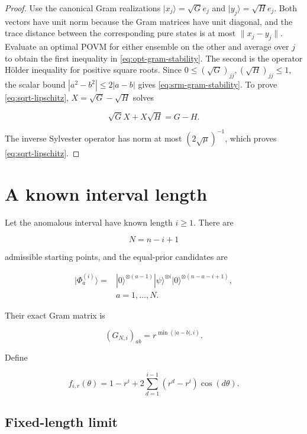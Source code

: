 \begin{proof}
Use the canonical Gram realizations \(|x_j\rangle=\sqrt G e_j\) and
\(|y_j\rangle=\sqrt H e_j\). Both vectors have unit norm because the Gram
matrices have unit diagonal, and the trace distance between the corresponding
pure states is at most \(\|x_j-y_j\|\). Evaluate an optimal POVM for either
ensemble on the other and average over \(j\) to obtain the first inequality in
\eqref{eq:opt-gram-stability}. The second is the operator Hölder inequality
for positive square roots. Since
\(0\le(\sqrt G)_{jj},(\sqrt H)_{jj}\le1\), the scalar bound
\(|a^2-b^2|\le2|a-b|\) gives \eqref{eq:srm-gram-stability}. To prove
\eqref{eq:sqrt-lipschitz}, \(X=\sqrt G-\sqrt H\) solves

\[
\sqrt G X+X\sqrt H=G-H.
\]

The inverse Sylvester operator has norm at most \((2\sqrt\mu)^{-1}\), which proves \eqref{eq:sqrt-lipschitz}.
\end{proof}

\section{A known interval length}\label{a-known-interval-length}

Let the anomalous interval have known length \(i\ge1\). There are

\[
N=n-i+1
\]

admissible starting points, and the equal-prior candidates are

\begin{align*}
|\Phi_a^{(i)}\rangle
={}&|0\rangle^{\otimes(a-1)}|\psi\rangle^{\otimes i}
|0\rangle^{\otimes(n-a-i+1)}, \\
&a=1,\ldots,N.
\end{align*}

Their exact Gram matrix is

\begin{equation}\label{eq:fixed-gram}
(G_{N,i})_{ab}=r^{\min(|a-b|,i)}.
\end{equation}

Define

\begin{equation}\label{eq:fixed-symbol}
f_{i,r}(\theta)
=1-r^i+2\sum_{d=1}^{i-1}(r^d-r^i)\cos(d\theta).
\end{equation}

\subsection{Fixed-length limit}\label{fixed-length-limit}


